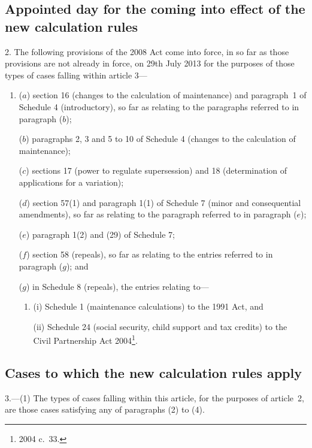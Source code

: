 \documentclass[12pt,a4paper]{article}
\begin{document}
\subsection[2. Appointed day for the coming into effect of the new calculation rules]{Appointed day for the coming into effect of the new calculation rules}

2.  The following provisions of the 2008 Act come into force, in so far as those provisions are not already in force, on 29th July 2013 for the purposes of those types of cases falling within article 3—
\begin{enumerate}\item[]
($a$) section 16 (changes to the calculation of maintenance) and paragraph~1 of Schedule 4 (introductory), so far as relating to the paragraphs referred to in paragraph ($b$);

($b$) paragraphs 2, 3 and 5 to 10 of Schedule 4 (changes to the calculation of maintenance);

($c$) sections 17 (power to regulate supersession) and 18 (determination of applications for a variation);

($d$) section 57(1) and paragraph 1(1) of Schedule 7 (minor and consequential amendments), so far as relating to the paragraph referred to in paragraph ($e$);

($e$) paragraph 1(2) and (29) of Schedule 7;

($f$) section 58 (repeals), so far as relating to the entries referred to in paragraph ($g$); and

($g$) in Schedule 8 (repeals), the entries relating to—
\begin{enumerate}\item[]
(i) Schedule 1 (maintenance calculations) to the 1991 Act, and

(ii) Schedule 24 (social security, child support and tax credits) to the Civil Partnership Act 2004\footnote{2004 c.~33.}.
\end{enumerate}
\end{enumerate}

\subsection[3. Cases to which the new calculation rules apply]{Cases to which the new calculation rules apply}

3.---(1)  The types of cases falling within this article, for the purposes of article~2, are those cases satisfying any of paragraphs (2) to (4).
\end{document}
